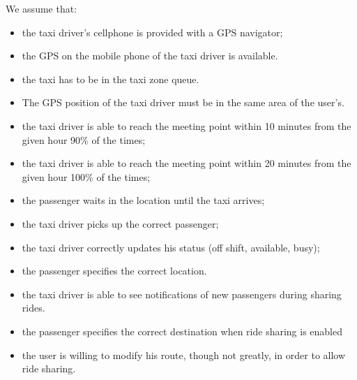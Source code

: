 We assume that:
\begin{itemize}
\item the taxi driver's cellphone is provided with a GPS navigator;
\item the GPS on the mobile phone of the taxi driver is available.
\item the taxi has to be in the taxi zone queue.
\item The GPS position of the taxi driver must be in the same area of the user's.
\item the taxi driver is able to reach the meeting point within 10 minutes from the given hour 90\% of the times;
\item the taxi driver is able to reach the meeting point within 20 minutes from the given hour 100\% of the times;
\item the passenger waits in the location until the taxi arrives;
\item the taxi driver picks up the correct passenger;
\item the taxi driver correctly updates his status (off shift, available, busy);
\item the passenger specifies the correct location.
\item the taxi driver is able to see notifications of new passengers during sharing rides.
\item the passenger specifies the correct destination when ride sharing is enabled
\item the user is willing to modify his route, though not greatly, in order to allow ride sharing.
\end{itemize}
